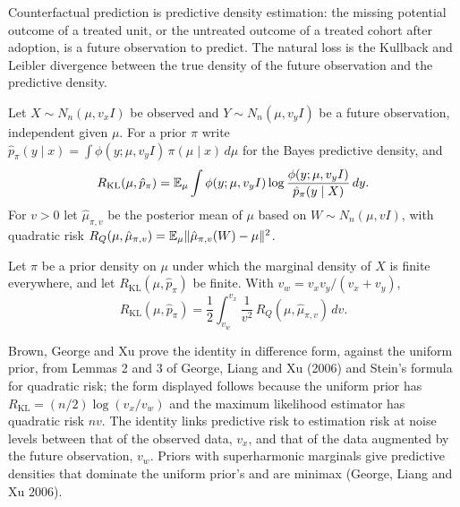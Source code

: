 Counterfactual prediction is predictive density estimation: the missing potential outcome of a treated unit, or the untreated outcome of a treated cohort after adoption, is a future observation to predict. The natural loss is the Kullback and Leibler divergence between the true density of the future observation and the predictive density.

Let $X\sim N_n(\mu, v_x I)$ be observed and $Y\sim N_n(\mu, v_yI)$ be a future observation, independent given $\mu$. For a prior $\pi$ write $\hat p_\pi(y\mid x) = \int\phi(y;\mu,v_yI)\,\pi(\mu\mid x)\,d\mu$ for the Bayes predictive density, and
\[
R_{\mathrm{KL}}(\mu,\hat p_\pi) = \mathbb{E}_\mu\int\phi(y;\mu,v_yI)\log\frac{\phi(y;\mu,v_yI)}{\hat p_\pi(y\mid X)}\,dy .
\]
For $v>0$ let $\hat\mu_{\pi,v}$ be the posterior mean of $\mu$ based on $W\sim N_n(\mu,vI)$, with quadratic risk $R_Q(\mu,\hat\mu_{\pi,v}) = \mathbb{E}_\mu\lVert\hat\mu_{\pi,v}(W)-\mu\rVert^2$.

\begin{theorem}\label{pg:thm:glx}
Let $\pi$ be a prior density on $\mu$ under which the marginal density of $X$ is finite everywhere, and let $R_{\mathrm{KL}}(\mu,\hat p_\pi)$ be finite. With $v_w = v_xv_y/(v_x+v_y)$,
\[
R_{\mathrm{KL}}(\mu,\hat p_\pi) = \frac12\int_{v_w}^{v_x}\frac{1}{v^2}\,R_Q(\mu,\hat\mu_{\pi,v})\,dv .
\]
\end{theorem}

Brown, George and Xu prove the identity in difference form, against the uniform prior, from Lemmas 2 and 3 of George, Liang and Xu (2006) and Stein's formula for quadratic risk; the form displayed follows because the uniform prior has $R_{\mathrm{KL}} = (n/2)\log(v_x/v_w)$ and the maximum likelihood estimator has quadratic risk $nv$. The identity links predictive risk to estimation risk at noise levels between that of the observed data, $v_x$, and that of the data augmented by the future observation, $v_w$. Priors with superharmonic marginals give predictive densities that dominate the uniform prior's and are minimax (George, Liang and Xu 2006).

